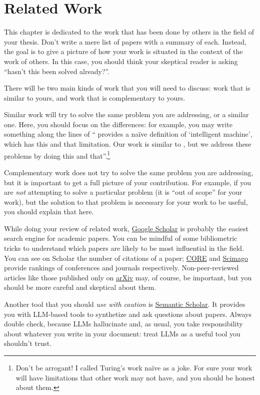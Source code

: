 \chapter{Related Work}
\label{sec:related}

This chapter is dedicated to the work that has been done by others in the field of your thesis.
Don't write a mere list of papers with a summary of each. Instead, the goal is to give a picture
of how your work is situated in the context of the work of others. In this case, you should
think your skeptical reader is asking ``hasn't this been solved already?''.

There will be two main kinds of work that you will need to discuss: work that is similar
to yours, and work that is complementary to yours.

Similar work will try to solve the same problem you are addressing, or a similar one.
Here, you should focus on the differences: for example, you may write something along the
lines of ``\textcite{DBLP:journals/x/Turing50} provides a naïve definition of
`intelligent machine', which has this and that limitation. Our work is similar to
\citeauthor{DBLP:journals/x/Turing50}, but we address these problems by doing this and
that''.\footnote{Don't be arrogant! I called Turing's work naïve as a joke.
For sure your work will have limitations that other work
may not have, and you should be honest about them.}

Complementary work does not try to solve the same problem you are addressing, but it is
important to get a full picture of your contribution. For example, if you are
\emph{not} attempting to solve a particular problem (it is ``out of scope'' for your work),
but the solution to that problem is necessary for your work to be useful, you should explain
that here.

While doing your review of related work, \href{https://scholar.google.com}{Google Scholar}
is probably the easiest search engine for academic papers. You can be mindful of some
bibliometric tricks to understand which papers are likely to be most influential in the field.
You can see on Scholar the number of citations of a paper;
\href{https://portal.core.edu.au/conf-ranks/}{CORE} and
\href{https://www.scimagojr.com}{Scimago} provide rankings of conferences and journals
respectively. Non-peer-reviewed articles like those published only on
\href{https://arxiv.org}{arXiv} may, of course, be important, but you should be more careful
and skeptical about them.

Another tool that you should \emph{use with caution} is \href{https://www.semanticscholar.org/}{Semantic Scholar}. It provides you with LLM-based tools to synthetize and ask questions about papers. Always double check, because LLMs hallucinate and, as usual, you take responsibility about whatever you write in your document: treat LLMs as a useful tool you shouldn't trust.

